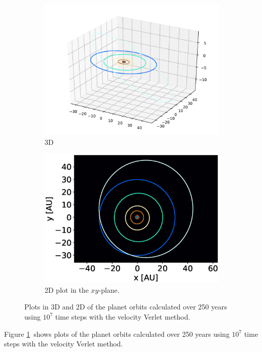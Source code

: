 \documentclass[a4paper,10pt,twocolumn]{article}
\begin{document}
\begin{figure}
	\centering
	\begin{subfigure}{.5\textwidth}
		\centering
		\includegraphics[width=\linewidth]{sol250vv73d.pdf}
		\caption{3D}
	\end{subfigure}%
	\begin{subfigure}{.5\textwidth}
		\centering
		\includegraphics[width=\linewidth]{sol250vv72d.eps}
		\caption{2D plot in the $xy$-plane.}
	\end{subfigure}
	\caption{Plots in 3D and 2D of the planet orbits calculated over 250 years using $10^7$ time steps with the velocity Verlet method.}
	\label{fig:sol}
\end{figure}
Figure \ref{fig:sol} shows  plots of the planet orbits calculated over 250 years using $10^7$ time steps with the velocity Verlet method. 
\end{document}
